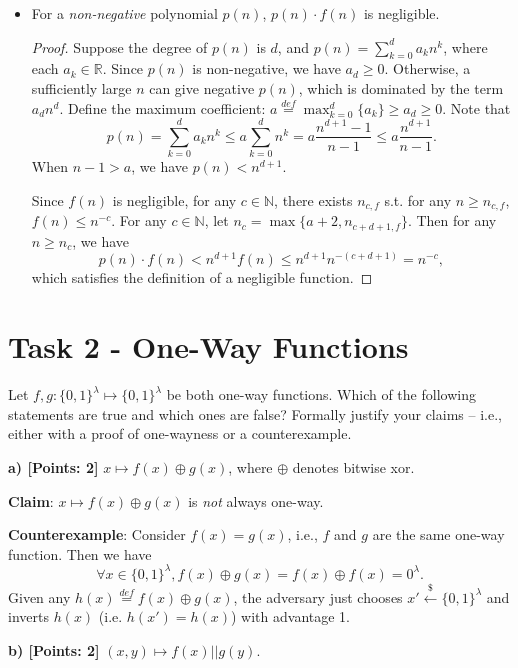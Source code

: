 \documentclass[12pt]{article}
\newcommand{\eqdef}{\stackrel{def}{=}}
\newcommand{\N}{\mathbb{N}}
\newcommand{\R}{\mathbb{R}}
\newcommand{\bits}{\{0,1\}}
\newcommand{\getsr}{\stackrel{\$}{\gets}}
\theoremstyle{definition}
\begin{document}
\begin{itemize}
\item For a \emph{non-negative} polynomial $p(n)$, $p(n)\cdot f(n)$ is negligible.
\begin{proof}
Suppose the degree of $p(n)$ is $d$, and $p(n) = \sum_{k=0}^d a_kn^k$, where each $a_k\in\R$.
Since $p(n)$ is non-negative, we have $a_d \geq 0$. Otherwise, a sufficiently large $n$ can give negative $p(n)$, which is dominated by the term $a_dn^d$.
Define the maximum coefficient: $a \eqdef \max_{k=0}^d \{a_k\} \geq a_d \geq 0$. Note that 
$$p(n) = \sum_{k=0}^d a_kn^k \leq a \sum_{k=0}^d n^k = a \frac{n^{d+1}-1}{n-1} \leq a \frac{n^{d+1}}{n-1}.$$
When $n-1>a$, we have $p(n) < n^{d+1}$. 

Since $f(n)$ is negligible, for any $c\in\N$, there exists $n_{c,f}$ s.t. for any $n\geq n_{c,f}$, $f(n) \leq n^{-c}$. 
For any $c\in\N$, let $n_c = \max\{a+2, n_{c+d+1,f}\}$. Then for any $n\geq n_c$, we have
$$p(n)\cdot f(n) < n^{d+1} f(n) \leq n^{d+1} n^{-(c+d+1)} = n^{-c},$$
which satisfies the definition of a negligible function.
\end{proof}
\end{itemize}

\section{Task 2 - One-Way Functions}
Let $f, g : \bits^\lambda \mapsto \bits^\lambda$ be both one-way functions. Which of the following statements
are true and which ones are false? Formally justify your claims – i.e., either with a proof
of one-wayness or a counterexample.

{\bf a) [Points: 2]} $x \mapsto f(x) \oplus g(x)$, where $\oplus$ denotes bitwise xor.

{\bf Claim}: $x \mapsto f(x) \oplus g(x)$ is \emph{not} always one-way.

{\bf Counterexample}:
Consider $f(x) = g(x)$, i.e., $f$ and $g$ are the same one-way function. Then we have
$$\forall x\in\bits^\lambda, f(x) \oplus g(x) = f(x) \oplus f(x) = 0^\lambda.$$
Given any $h(x) \eqdef f(x) \oplus g(x)$, the adversary just chooses $x' \getsr \bits^\lambda$ and inverts $h(x)$ (i.e. $h(x')=h(x)$) with advantage 1.

{\bf b) [Points: 2]} $(x, y) \mapsto f(x) || g(y)$.
\end{document}
